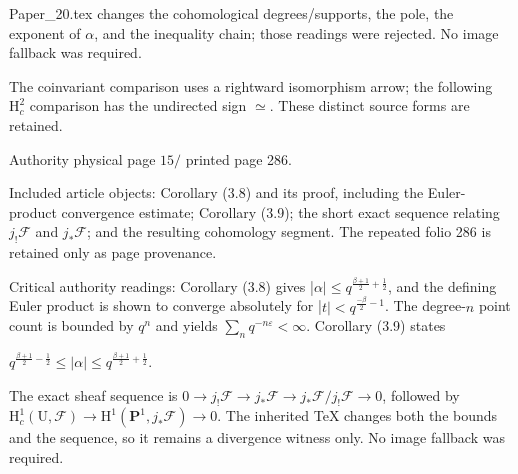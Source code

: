 \documentclass[10pt,leqno]{article}
\begin{document}
\noindent Paper\_20.tex changes the cohomological degrees/supports, the pole, the exponent of \(\alpha \), and the inequality chain; those readings were rejected. No image fallback was required.\par

\noindent The coinvariant comparison uses a rightward isomorphism arrow; the following \(\mathrm{H}_{c}^{2}\) comparison has the undirected sign \(\simeq \). These distinct source forms are retained.\par

\clearpage

\label{physical-15}\par\smallskip

\noindent Authority physical page \(15 /\) printed page 286.\par

\noindent Included article objects: Corollary (3.8) and its proof, including the Euler-product convergence estimate; Corollary (3.9); the short exact sequence relating \(j_{!}\mathcal{F} \) and \(j_{*}\mathcal{F} \); and the resulting cohomology segment. The repeated folio 286 is retained only as page provenance.\par

\noindent Critical authority readings: Corollary (3.8) gives |\(\alpha |\leq q^{\frac{\beta+1}{2}+\frac{1}{2}}\), and the defining Euler product is shown to converge absolutely for |\(t|<q^{\frac{-\beta}{2}- 1}\). The degree-\(n\) point count is bounded by \(q^{n}\) and yields \(\sum _{n} q^{- n\varepsilon }<\infty \). Corollary (3.9) states\par

\noindent \(q^{\frac{\beta+1}{2}- \frac{1}{2}}\leq |\alpha |\leq q^{\frac{\beta+1}{2}+\frac{1}{2}}\).\par

\noindent The exact sheaf sequence is \(0\longrightarrow j_{!}\mathcal{F} \longrightarrow j_{*}\mathcal{F} \longrightarrow j_{*}\mathcal{F} /j_{!}\mathcal{F} \longrightarrow 0\), followed by \(\mathrm{H}_{c}^{1}(\mathrm{U},\mathcal{F} )\longrightarrow \mathrm{H}^{1}(\mathbf{P}^{1},j_{*}\mathcal{F} )\longrightarrow 0\). The inherited TeX changes both the bounds and the sequence, so it remains a divergence witness only. No image fallback was required.\par

\clearpage

\label{physical-16}\par\smallskip
\end{document}
